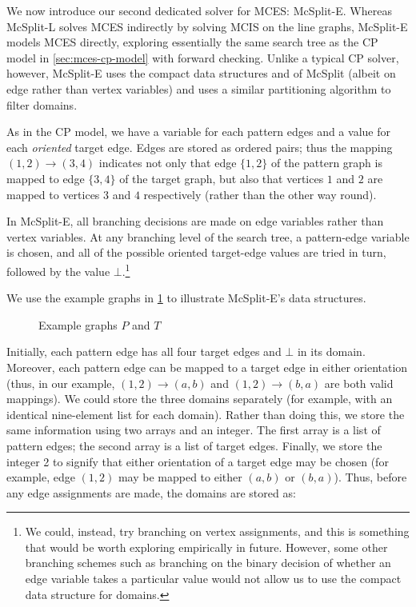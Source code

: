 We now introduce our second dedicated solver for MCES: McSplit-E.  Whereas
McSplit-L solves MCES indirectly by solving MCIS on the line graphs, McSplit-E
models MCES directly, exploring essentially the same search tree as the CP
model in \cref{sec:mces-cp-model} with forward checking.  Unlike a typical CP
solver, however, McSplit-E uses the compact data structures and of McSplit
(albeit on edge rather than vertex variables) and uses a similar partitioning
algorithm to filter domains.

As in the CP model, we have a variable for each pattern edges and a value
for each \textit{oriented} target edge.  Edges are stored as ordered pairs; thus the mapping
$(1,2) \rightarrow (3,4)$ indicates not only that edge $\{1,2\}$ of the pattern graph is
mapped to edge $\{3,4\}$ of the target graph, but also that vertices $1$ and $2$ are mapped
to vertices $3$ and $4$ respectively (rather than the other way round).

In McSplit-E, all branching decisions are made on edge variables rather than vertex variables.
At any branching level of the search tree, a pattern-edge variable is chosen, and all of the possible
oriented target-edge values are tried in turn, followed by the value
$\bot$.\footnote{We could, instead, try branching on vertex assignments, and this is
something that would be worth exploring empirically in future.  However, some other
branching schemes such as branching on the binary decision of whether an edge variable takes
a particular value would not allow us to use the compact data structure for domains.}

We use the example graphs in \cref{fig:splitp-example} to illustrate McSplit-E's data structures.
\begin{figure}[htb]
    \centering
    
    \caption{Example graphs $P$ and $T$}
    \label{fig:splitp-example}
\end{figure}

Initially, each pattern edge has all four
target edges and $\bot$ in its domain.  Moreover, each pattern edge can be mapped to a target edge in either orientation
(thus, in our example, $(1,2) \rightarrow (a,b)$ and $(1,2) \rightarrow (b,a)$ are both valid mappings). 
We could store the three domains separately (for example, with an identical nine-element list for each domain).
Rather than doing this, we store the same
information using two arrays and an integer.  The first array is a list of pattern edges;
the second array is a list of target edges. Finally, we store the integer 2 to signify that either orientation of a
target edge may be chosen (for example, edge $(1,2)$ may be mapped to either $(a,b)$ or $(b,a)$).
Thus, before any edge assignments are made, the domains are stored as:

